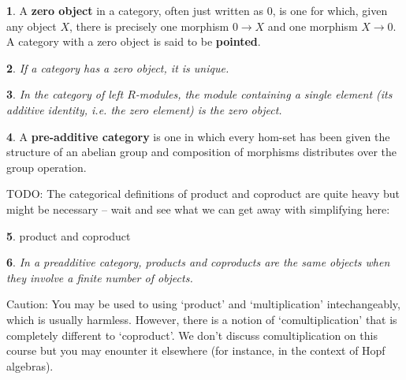 \documentclass[oneside,english]{amsbook}
\numberwithin{section}{chapter}
\theoremstyle{plain}
\newtheorem{thm}{\protect\theoremname}
\theoremstyle{definition}
\newtheorem{defn}[thm]{\protect\definitionname}
\providecommand{\definitionname}{Definition}
\providecommand{\theoremname}{Theorem}
\begin{document}
			\begin{defn}
				A \textbf{zero object} in a category, often just written as $0$, is one for which, given any object $X$, there is precisely one morphism $0\to X$ and one morphism $X\to 0$. A category with a zero object is said to be \textbf{pointed}.
			\end{defn}
			
			\begin{thm}
				If a category has a zero object, it is unique.
			\end{thm}
			
			\begin{thm}
				In the category of left $R$-modules, the module containing a single element (its additive identity, i.e. the zero element) is the zero object.
			\end{thm}

			\begin{defn}
				A \textbf{pre-additive category} is one in which every hom-set has been given the structure of an abelian group and composition of morphisms distributes over the group operation.				
			\end{defn}
			
			TODO: The categorical definitions of product and coproduct are quite heavy but might be necessary -- wait and see what we can get away with simplifying here:
			
			\begin{defn}
				product and coproduct
			\end{defn}
			
			\begin{thm}
				In a preadditive category, products and coproducts are the same objects when they involve a finite number of objects.
			\end{thm}
			
			Caution: You may be used to using `product' and `multiplication' intechangeably, which is usually harmless. However, there is a notion of `comultiplication' that is completely different to `coproduct'. We don't discuss comultiplication on this course but you may enounter it elsewhere (for instance, in the context of Hopf algebras).
			
\end{document}
